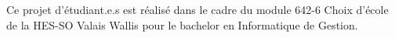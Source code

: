 Ce projet d'étudiant.e.s est réalisé dans le cadre du module 642-6 Choix d'école de la HES-SO Valais Wallis pour le bachelor en Informatique de Gestion.




